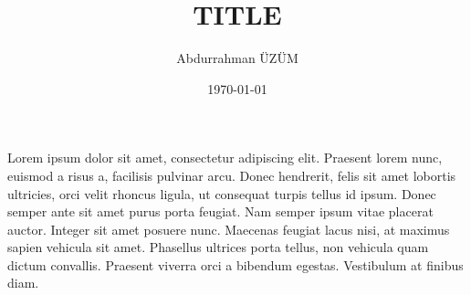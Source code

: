 \documentclass[12pt, a4paper]{article}
\title{TITLE}
\author{Abdurrahman ÜZÜM}
\date{\today}
\begin{document}
    \maketitle

    Lorem ipsum dolor sit amet, consectetur adipiscing elit. Praesent lorem nunc, euismod a risus a,
    facilisis pulvinar arcu. Donec hendrerit, felis sit amet lobortis ultricies, orci velit rhoncus 
    ligula, ut consequat turpis tellus id ipsum. Donec semper ante sit amet purus porta feugiat. 
    Nam semper ipsum vitae placerat auctor. Integer sit amet posuere nunc. Maecenas feugiat lacus 
    nisi, at maximus sapien vehicula sit amet. Phasellus ultrices porta tellus, non vehicula quam 
    dictum convallis. Praesent viverra orci a bibendum egestas. Vestibulum at finibus diam.


    

    

    
\end{document}
